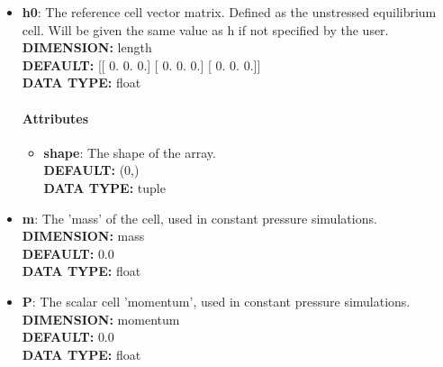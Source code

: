 \begin{itemize}
\item {\bf h0}:
 The reference cell vector matrix. Defined as the unstressed equilibrium cell. Will be given the same value as h if not specified by the user.
{\\ \bf DIMENSION: }length
{\\ \bf DEFAULT: }
      [[ 0.  0.  0.]
       [ 0.  0.  0.]
       [ 0.  0.  0.]]
{\\ \bf DATA TYPE: }float
\paragraph{Attributes}
 \begin{itemize}
\item {\bf shape}:
 The shape of the array.
{\\ \bf DEFAULT: }(0,)
{\\ \bf DATA TYPE: }tuple
\end{itemize}
 
\item {\bf m}:
 The 'mass' of the cell, used in constant pressure simulations.
{\\ \bf DIMENSION: }mass
{\\ \bf DEFAULT: }0.0
{\\ \bf DATA TYPE: }float
\item {\bf P}:
 The scalar cell 'momentum', used in constant pressure simulations.
{\\ \bf DIMENSION: }momentum
{\\ \bf DEFAULT: }0.0
{\\ \bf DATA TYPE: }float
\end{itemize}
 
